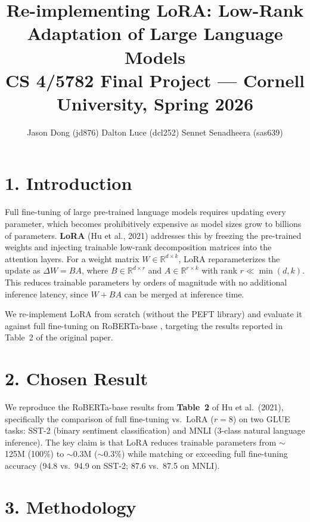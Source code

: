 \documentclass[11pt]{article}
\title{
  \vspace{-1.5em}
  \large\textbf{Re-implementing LoRA: Low-Rank Adaptation of Large Language Models} \\
  \normalsize CS 4/5782 Final Project --- Cornell University, Spring 2026
}
\author{
  Jason Dong (jd876) \quad Dalton Luce (dcl252) \quad Sennet Senadheera (sas639)
}
\date{}
\begin{document}
\maketitle
\vspace{-1em}

\section*{1. Introduction}

Full fine-tuning of large pre-trained language models requires updating every
parameter, which becomes prohibitively expensive as model sizes grow to billions
of parameters. \textbf{LoRA} (Hu et al., 2021) \cite{lora} addresses this by
freezing the pre-trained weights and injecting trainable low-rank decomposition
matrices into the attention layers. For a weight matrix $W \in \mathbb{R}^{d
\times k}$, LoRA reparameterizes the update as $\Delta W = BA$, where $B \in
\mathbb{R}^{d \times r}$ and $A \in \mathbb{R}^{r \times k}$ with rank $r \ll
\min(d, k)$. This reduces trainable parameters by orders of magnitude with no
additional inference latency, since $W + BA$ can be merged at inference time.

We re-implement LoRA from scratch (without the PEFT library) and evaluate it
against full fine-tuning on RoBERTa-base \cite{roberta}, targeting the results
reported in Table~2 of the original paper.

\section*{2. Chosen Result}

We reproduce the RoBERTa-base results from \textbf{Table~2} of Hu et al.\ (2021),
specifically the comparison of full fine-tuning vs.\ LoRA ($r=8$) on two GLUE
\cite{glue} tasks: SST-2 (binary sentiment classification) and MNLI (3-class
natural language inference). The key claim is that LoRA reduces trainable
parameters from $\sim$125M (100\%) to $\sim$0.3M ($\sim$0.3\%) while matching
or exceeding full fine-tuning accuracy (94.8 vs.\ 94.9 on SST-2; 87.6 vs.\ 87.5
on MNLI).

\section*{3. Methodology}
\end{document}
